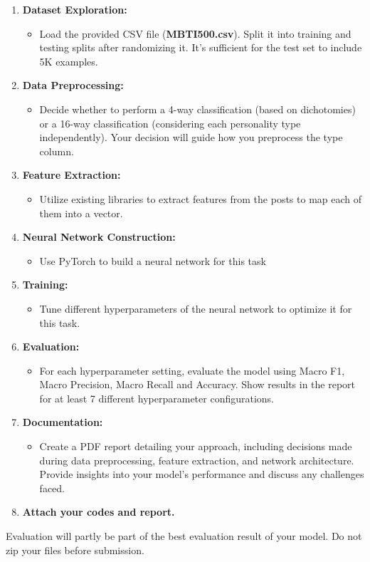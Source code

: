 \documentclass{article}
\begin{document}
\begin{enumerate}
    \item \textbf{Dataset Exploration:}
        \begin{itemize}
            \item Load the provided CSV file (\textbf{MBTI500.csv}). Split it into training and testing splits after randomizing it. It's sufficient for the test set to include 5K examples.
        \end{itemize}
    \item \textbf{Data Preprocessing:}
        \begin{itemize}
            \item Decide whether to perform a 4-way classification (based on dichotomies) or a 16-way classification (considering each personality type independently). Your decision will guide how you preprocess the type column.
        \end{itemize}
    \item \textbf{Feature Extraction:}
        \begin{itemize}
            \item Utilize existing libraries to extract features from the posts to map each of them into a vector.
        \end{itemize}
    \item \textbf{Neural Network Construction:}
        \begin{itemize}
            \item Use PyTorch to build a neural network for this task 
        \end{itemize}
    \item \textbf{Training:}
        \begin{itemize}
            \item Tune different hyperparameters of the neural network to optimize it for this task. 
        \end{itemize}
    \item \textbf{Evaluation:}
        \begin{itemize}
            \item For each hyperparameter setting, evaluate the model using Macro F1, Macro Precision, Macro Recall and Accuracy. Show results in the report for at least 7 different hyperparameter configurations.
        \end{itemize}
    \item \textbf{Documentation:}
        \begin{itemize}
            \item Create a PDF report detailing your approach, including decisions made during data preprocessing, feature extraction, and network architecture. Provide insights into your model's performance and discuss any challenges faced.
        \end{itemize}
    \item \textbf{Attach your codes and report.}
\end{enumerate}
Evaluation will partly be part of the best evaluation result of your model. Do not zip your files before submission.
\end{document}
